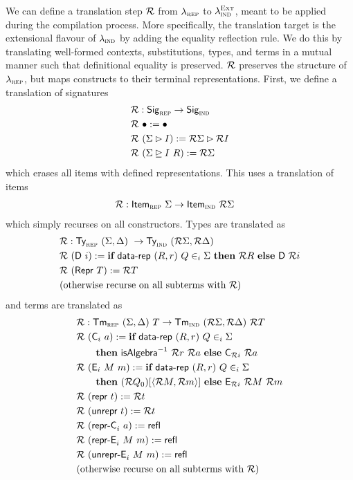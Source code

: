 We can define a translation step $\mathcal{R}$ from $\lambda_{\textsc{rep}}$ to
$\lambda_{\textsc{ind}}^{\textsc{Ext}}$, meant to be applied during the compilation process.
More specifically, the translation target is the extensional flavour of
$\lambda_{\textsc{ind}}$ by adding the equality reflection rule. We do this by translating
well-formed contexts, substitutions, types, and terms in a mutual manner such
that definitional equality is preserved.
$\mathcal{R}$ preserves the structure of
$\lambda_{\textsc{rep}}$, but maps constructs to their terminal representations.
First, we define a translation of signatures
\begin{align*}
& \mathcal{R} : \textsf{Sig}_{\textsc{rep}} \to \textsf{Sig}_{\textsc{ind}} \\
& \mathcal{R}\ \bullet := \bullet \\
& \mathcal{R}\ (\Sigma \rhd I) := \mathcal{R} \Sigma \rhd \mathcal{R} I \\
& \mathcal{R}\ (\Sigma \unrhd I \ R) := \mathcal{R} \Sigma
\end{align*}
which erases all items with defined representations.
This uses a translation of items
\begin{align*}
& \mathcal{R} : \textsf{Item}_{\textsc{rep}}\ \Sigma \to \textsf{Item}_{\textsc{ind}}\ \mathcal{R} \Sigma
\end{align*}
which simply recurses on all constructors. Types are translated as
\begin{align*}
  & \mathcal{R} : \textsf{Ty}_{\textsc{rep}}\ (\Sigma, \Delta)\ \to \textsf{Ty}_{\textsc{ind}}\ (\mathcal{R} \Sigma, \mathcal{R} \Delta) \\
  & \mathcal{R}\ (\textsf{D}\ i) := \textbf{if}\ \textsf{data-rep}\ (R, r)\ Q \in_i \Sigma\ \textbf{then}\ \mathcal{R} R\ \textbf{else}\ \textsf{D}\ \mathcal{R} i \\
  & \mathcal{R}\ (\textsf{Repr}\ T) := \mathcal{R} T \\
  & \text{(otherwise recurse on all subterms with $\mathcal{R}$)}
\end{align*}
and terms are translated as
\begin{align*}
  & \R : \Tm_\rep\ (\Sigma, \Delta)\ T \to \Tm_\ind\ (\R \Sigma, \R \Delta)\ \R T \\
  & \R\ (\mta{C}_i\ a) := \kwd{if}\ \mta{data-rep}\ (R, r)\ Q \in_i \Sigma\ \\
    &\qquad \kwd{then}\ \mta{isAlgebra}^{-1}\ \R r\ \R a\ \kwd{else}\ \mta{C}_{\R i}\ \R a \\
  & \R\ (\mta{E}_i\ M\ m) :=  \kwd{if}\ \mta{data-rep}\ (R, r)\ Q \in_i \Sigma\ \\
    &\qquad \kwd{then}\ (\R Q_0)[\Msub{\R M, \R m}]\ \kwd{else}\ \mta{E}_{\R i}\ \R M\ \R m \\
  & \R\ (\Mrepr\ t) := \R t \\
  & \R\ (\Munrepr\ t) := \R t \\
  & \R\ (\mta{repr-C}_i\ a) := \mta{refl} \\
  & \R\ (\mta{repr-E}_i\ M\ m) := \mta{refl} \\
  & \R\ (\mta{unrepr-E}_i\ M\ m) := \mta{refl} \\
  & \text{(otherwise recurse on all subterms with $\R$)}
\end{align*}

